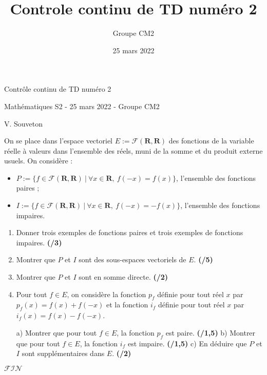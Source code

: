 \documentclass[french]{article}
\title{Controle continu de TD numéro 2}
\author{Groupe CM2}
\date{25 mars 2022}
\begin{document}
\thispagestyle{empty}

\begin{center}
	\huge Contrôle continu de TD numéro 2 
	
	\large Mathématiques S2 - 25 mars 2022 - Groupe CM2
	
	\large V. Souveton
\end{center}

\vspace{1\baselineskip}

\noindent
On se place dans l'espace vectoriel $E := \mathcal{F}(\mathbf{R},\mathbf{R})$ des fonctions de la variable réelle à valeurs dans l'ensemble des réels, muni de la somme et du produit externe usuels. On considère : 

\begin{itemize}
	\item $P := \{ f \in \mathcal{F}(\mathbf{R},\mathbf{R}) \ | \ \forall x \in \mathbf{R}, \ f(-x) = f(x)\}$, l'ensemble des fonctions paires ;
	\item $I := \{ f \in \mathcal{F}(\mathbf{R},\mathbf{R}) \ | \ \forall x \in \mathbf{R}, \ f(-x) = -f(x)\}$, l'ensemble des fonctions impaires.
\end{itemize}

\vspace{1\baselineskip}

\begin{enumerate}
	\item Donner trois exemples de fonctions paires et trois exemples de fonctions impaires. \textbf{(/3)}
	
	\vspace{1\baselineskip}
	
	\item Montrer que $P$ et $I$ sont des sous-espaces vectoriels de $E$. \textbf{(/5)}
	
	\vspace{1\baselineskip}
	
	\item Montrer que $P$ et $I$ sont en somme directe. \textbf{(/2)}
	
	\vspace{1\baselineskip}
	
	\item Pour tout $f \in E$, on considère la fonction $p_f$ définie pour tout réel $x$ par $p_f(x) = f(x) + f(-x)$ et la fonction $i_f$ définie pour tout réel $x$ par $i_f(x) = f(x) - f(-x)$.
	
	\vspace{0.5\baselineskip}
	
		\subitem a) Montrer que pour tout $f \in E$, la fonction $p_f$ est paire. \textbf{(/1,5)}
		\subitem b) Montrer que pour tout $f \in E$, la fonction $i_f$ est impaire. \textbf{(/1,5)}
		\subitem c) En déduire que $P$ et $I$ sont supplémentaires dans $E$. \textbf{(/2)}
\end{enumerate}

\vspace{2\baselineskip}

\begin{center}
	\huge $\mathcal{FIN}$
\end{center}
\end{document}
